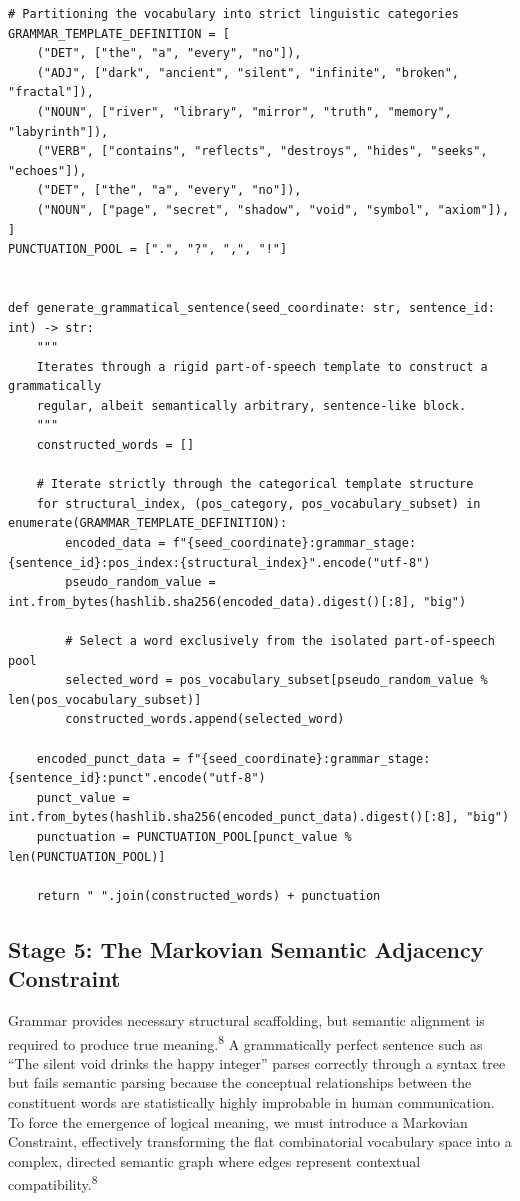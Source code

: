 \documentclass[
  11pt,
  a4paper,
]{article}
\begin{document}
\begin{lstlisting}[style=babelpython]
# Partitioning the vocabulary into strict linguistic categories
GRAMMAR_TEMPLATE_DEFINITION = [
    ("DET", ["the", "a", "every", "no"]),
    ("ADJ", ["dark", "ancient", "silent", "infinite", "broken", "fractal"]),
    ("NOUN", ["river", "library", "mirror", "truth", "memory", "labyrinth"]),
    ("VERB", ["contains", "reflects", "destroys", "hides", "seeks", "echoes"]),
    ("DET", ["the", "a", "every", "no"]),
    ("NOUN", ["page", "secret", "shadow", "void", "symbol", "axiom"]),
]
PUNCTUATION_POOL = [".", "?", ",", "!"]


def generate_grammatical_sentence(seed_coordinate: str, sentence_id: int) -> str:
    """
    Iterates through a rigid part-of-speech template to construct a grammatically
    regular, albeit semantically arbitrary, sentence-like block.
    """
    constructed_words = []

    # Iterate strictly through the categorical template structure
    for structural_index, (pos_category, pos_vocabulary_subset) in enumerate(GRAMMAR_TEMPLATE_DEFINITION):
        encoded_data = f"{seed_coordinate}:grammar_stage:{sentence_id}:pos_index:{structural_index}".encode("utf-8")
        pseudo_random_value = int.from_bytes(hashlib.sha256(encoded_data).digest()[:8], "big")

        # Select a word exclusively from the isolated part-of-speech pool
        selected_word = pos_vocabulary_subset[pseudo_random_value % len(pos_vocabulary_subset)]
        constructed_words.append(selected_word)

    encoded_punct_data = f"{seed_coordinate}:grammar_stage:{sentence_id}:punct".encode("utf-8")
    punct_value = int.from_bytes(hashlib.sha256(encoded_punct_data).digest()[:8], "big")
    punctuation = PUNCTUATION_POOL[punct_value % len(PUNCTUATION_POOL)]

    return " ".join(constructed_words) + punctuation
\end{lstlisting}

\subsection{Stage 5: The Markovian Semantic Adjacency Constraint}\label{stage-5-the-markovian-semantic-adjacency-constraint}

Grammar provides necessary structural scaffolding, but semantic alignment is required to produce true meaning.\textsuperscript{8} A grammatically perfect sentence such as ``The silent void drinks the happy integer'' parses correctly through a syntax tree but fails semantic parsing because the conceptual relationships between the constituent words are statistically highly improbable in human communication. To force the emergence of logical meaning, we must introduce a Markovian Constraint, effectively transforming the flat combinatorial vocabulary space into a complex, directed semantic graph where edges represent contextual compatibility.\textsuperscript{8}
\end{document}
